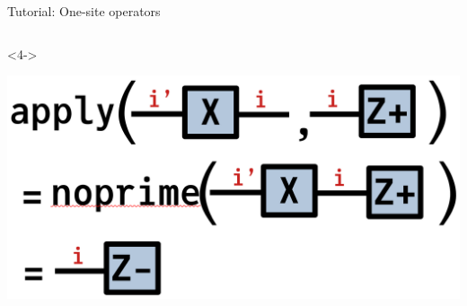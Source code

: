 \begin{frame}[fragile]{Tutorial: One-site operators}
\begin{columns}
\begin{column}{4.5cm}
\begin{onlyenv}<4->
\vspace*{0.2cm}
~\\
\begin{center}
\includegraphics[width=1.0\textwidth]{
  slides/assets/apply_XZp.png
}
\end{center}
\vspace*{0.0cm}
\end{onlyenv}

\end{column}

\end{columns}

\end{frame}

